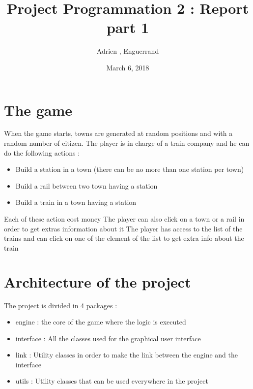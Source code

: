 \documentclass{article}
\title{Project Programmation 2 : Report part 1}
\author{Adrien \bsc{Bardes}, Enguerrand \bsc{Dezerces}}
\date{March 6, 2018}
\begin{document}
\maketitle

\section{The game}
When the game starts, towns are generated at random positions and with a random number of citizen. The player is in charge of a train company and he can do the following actions :
\begin{itemize}
	\item Build a station in a town (there can be no more than one station per town)
	\item Build a rail between two town having a station
	\item Build a train in a town having a station
\end{itemize}
Each of these action cost money
The player can also click on a town or a rail in order to get extras information about it
The player has access to the list of the trains and can click on one of the element of the list to get extra info about the train

\section{Architecture of the project}

The project is divided in 4 packages : 
\begin{itemize}
	\item engine : the core of the game where the logic is executed
	\item interface : All the classes used for the graphical user interface
	\item link : Utility classes in order to make the link between the engine and the interface
	\item utils : Utility classes that can be used everywhere in the project
\end{itemize}
\end{document}
